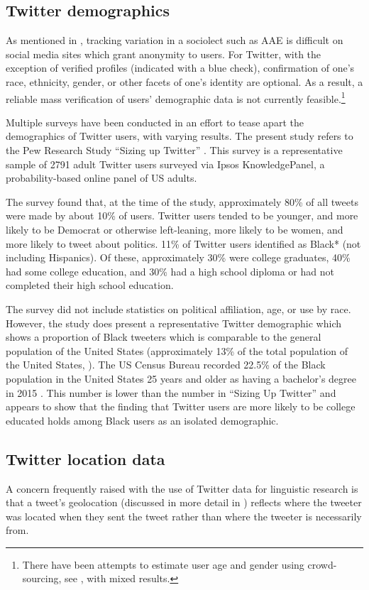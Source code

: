 \documentclass[output=paper,colorlinks,citecolor=brown,draftmode]{langscibook}
\begin{document}
\subsection{Twitter demographics}
As mentioned in \citet{chapters/01-baxter}, tracking variation in a sociolect such as AAE is difficult on social media sites which grant anonymity to users. For Twitter, with the exception of verified profiles (indicated with a blue check), confirmation of one’s race, ethnicity, gender, or other facets of one’s identity are optional. As a result, a reliable mass verification of users’ demographic data is not currently feasible.\footnote{There have been attempts to estimate user age and gender using crowd-sourcing, see \citet{nguyen2014}, with mixed results.}

Multiple surveys have been conducted in an effort to tease apart the demographics of Twitter users, with varying results. The present study refers to the Pew Research Study “Sizing up Twitter” \citep{mitchell2019a}. This survey is a representative sample of 2791 adult Twitter users surveyed via Ipsos KnowledgePanel, a probability-based online panel of US adults. 

The survey found that, at the time of the study, approximately 80\% of all tweets were made by about 10\% of users. Twitter users tended to be younger, and more likely to be Democrat or otherwise left-leaning, more likely to be women, and more likely to tweet about politics.  11\% of Twitter users identified as Black* (not including Hispanics). Of these, approximately 30\% were college graduates, 40\% had some college education, and 30\% had a high school diploma or had not completed their high school education. 

The survey did not include statistics on political affiliation, age, or use by race. However, the study does present a representative Twitter demographic which shows a proportion of Black tweeters which is comparable to the general population of the United States (approximately 13\% of the total population of the United States, \citealt{uscensusbureau2018}). The US Census Bureau recorded 22.5\% of the Black population in the United States 25 years and older as having a bachelor’s degree in 2015 \citep{ryan2016}. This number is lower than the number in “Sizing Up Twitter” and appears to show that the finding that Twitter users are more likely to be college educated holds among Black users as an isolated demographic.

\subsection{Twitter location data}
A concern frequently raised with the use of Twitter data for linguistic research is that a tweet’s geolocation (discussed in more detail in ) reflects where the tweeter was located when they sent the tweet rather than where the tweeter is necessarily from. 
\end{document}
